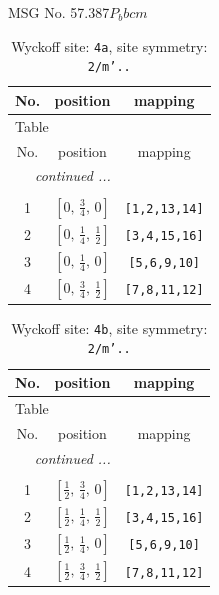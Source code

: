 \documentclass[fleqn,8pt]{jsarticle}
\begin{document}
\setcounter{MaxMatrixCols}{32}

\renewcommand{\tablename}{Table~}
\renewcommand{\figurename}{Figure~}
\begin{center}
\LARGE
MSG No. 57.387\quad$P_{b}bcm$
\end{center}
\renewcommand{\arraystretch}{1.2}
\begin{longtable}{ccc}
\caption{Wyckoff site: {\tt 4a}, site symmetry: {\tt 2/m'..}}
 \\
 \hline \hline
No. & position & mapping \\ \hline \endfirsthead

\multicolumn{2}{l}{\tablename\ \thetable{}} \\
 \hline \hline
No. & position & mapping \\ \hline \endhead

 \hline \hline
\multicolumn{2}{r}{\footnotesize\it continued ...} \\ \endfoot

 \hline \hline
\multicolumn{2}{r}{} \\ \endlastfoot

1 & $\left[ 0,\, \frac{3}{4},\, 0 \right]$ & {\tt [1,2,13,14]} \\ \hline
2 & $\left[ 0,\, \frac{1}{4},\, \frac{1}{2} \right]$ & {\tt [3,4,15,16]} \\ \hline
3 & $\left[ 0,\, \frac{1}{4},\, 0 \right]$ & {\tt [5,6,9,10]} \\ \hline
4 & $\left[ 0,\, \frac{3}{4},\, \frac{1}{2} \right]$ & {\tt [7,8,11,12]} \\
\end{longtable}
\renewcommand{\arraystretch}{1.2}
\begin{longtable}{ccc}
\caption{Wyckoff site: {\tt 4b}, site symmetry: {\tt 2/m'..}}
 \\
 \hline \hline
No. & position & mapping \\ \hline \endfirsthead

\multicolumn{2}{l}{\tablename\ \thetable{}} \\
 \hline \hline
No. & position & mapping \\ \hline \endhead

 \hline \hline
\multicolumn{2}{r}{\footnotesize\it continued ...} \\ \endfoot

 \hline \hline
\multicolumn{2}{r}{} \\ \endlastfoot

1 & $\left[ \frac{1}{2},\, \frac{3}{4},\, 0 \right]$ & {\tt [1,2,13,14]} \\ \hline
2 & $\left[ \frac{1}{2},\, \frac{1}{4},\, \frac{1}{2} \right]$ & {\tt [3,4,15,16]} \\ \hline
3 & $\left[ \frac{1}{2},\, \frac{1}{4},\, 0 \right]$ & {\tt [5,6,9,10]} \\ \hline
4 & $\left[ \frac{1}{2},\, \frac{3}{4},\, \frac{1}{2} \right]$ & {\tt [7,8,11,12]} \\
\end{longtable}
\end{document}
